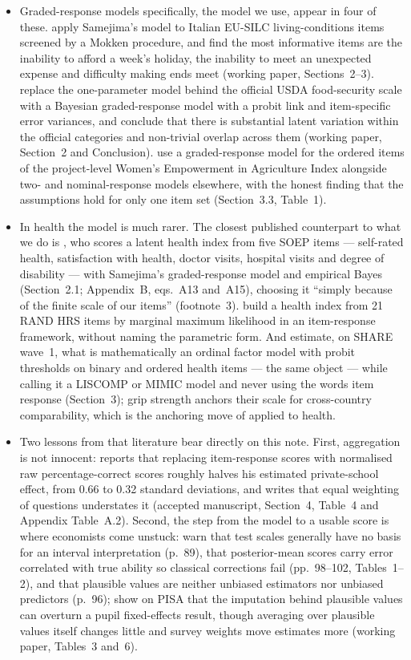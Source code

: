 \documentclass[11pt]{article}
\begin{document}
\begin{itemize}
\item Graded-response models specifically, the model we use, appear in four of these. \citet{corsini2020} apply Samejima's model to Italian EU-SILC living-conditions items screened by a Mokken procedure, and find the most informative items are the inability to afford a week's holiday, the inability to meet an unexpected expense and difficulty making ends meet (working paper, Sections~2--3). \citet{davis2026} replace the one-parameter model behind the official USDA food-security scale with a Bayesian graded-response model with a probit link and item-specific error variances, and conclude that there is substantial latent variation within the official categories and non-trivial overlap across them (working paper, Section~2 and Conclusion). \citet{yount2019} use a graded-response model for the ordered items of the project-level Women's Empowerment in Agriculture Index alongside two- and nominal-response models elsewhere, with the honest finding that the assumptions hold for only one item set (Section~3.3, Table~1).
\item In health the model is much rarer. The closest published counterpart to what we do is \citet{graeber2023}, who scores a latent health index from five SOEP items --- self-rated health, satisfaction with health, doctor visits, hospital visits and degree of disability --- with Samejima's graded-response model and empirical Bayes (Section~2.1; Appendix~B, eqs.~A13 and~A15), choosing it ``simply because of the finite scale of our items'' (footnote~3). \citet{wallace2017} build a health index from 21 RAND HRS items by marginal maximum likelihood in an item-response framework, without naming the parametric form. And \citet{meijer2011} estimate, on SHARE wave~1, what is mathematically an ordinal factor model with probit thresholds on binary and ordered health items --- the same object --- while calling it a LISCOMP or MIMIC model and never using the words item response (Section~3); grip strength anchors their scale for cross-country comparability, which is the anchoring move of \citet{cunha2008} applied to health.
\item Two lessons from that literature bear directly on this note. First, aggregation is not innocent: \citet{singh2015} reports that replacing item-response scores with normalised raw percentage-correct scores roughly halves his estimated private-school effect, from 0.66 to 0.32 standard deviations, and writes that equal weighting of questions understates it (accepted manuscript, Section~4, Table~4 and Appendix Table~A.2). Second, the step from the model to a usable score is where economists come unstuck: \citet{jacob2016} warn that test scales generally have no basis for an interval interpretation (p.~89), that posterior-mean scores carry error correlated with true ability so classical corrections fail (pp.~98--102, Tables~1--2), and that plausible values are neither unbiased estimators nor unbiased predictors (p.~96); \citet{jerrim2017} show on PISA that the imputation behind plausible values can overturn a pupil fixed-effects result, though averaging over plausible values itself changes little and survey weights move estimates more (working paper, Tables~3 and~6).

\end{itemize}
\end{document}
